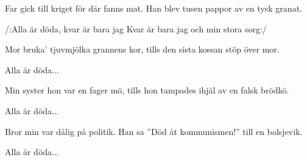 


	
\beginverse*		%
Far gick till kriget för där fanns mat.
Han blev tusen pappor av en tysk granat.
\endverse			%

\beginchorus
/:Alla är döda, kvar är bara jag
Kvar är bara jag och min stora sorg:/
\endchorus

\beginverse*		%
Mor bruka' tjuvmjölka grannens kor,
tills den sista kossan stöp över mor.
\endverse			%

\beginchorus
Alla är döda...
\endchorus

\beginverse*		%
Min syster hon var en fager mö,
tills hon tampades ihjäl av en falsk brödkö.
\endverse			%

\beginchorus
Alla är döda...
\endchorus

\beginverse*		%
Bror min var dålig på politik.
Han sa ''Död åt kommunismen!'' till en bolsjevik.
\endverse			%

\beginchorus
Alla är döda...
\endchorus
\endsong			%
